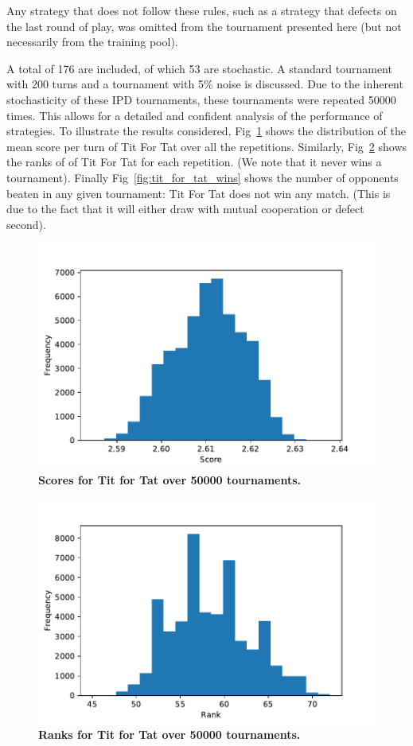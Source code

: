 \documentclass[10pt,letterpaper]{article}
\begin{document}
Any strategy that does not follow these rules, such as a strategy that defects
on the last round of play, was omitted from the tournament presented here (but
not necessarily from the training pool).

A total of 176 are included, of which
53 are stochastic.
A standard tournament with 200
turns and a tournament with 5\% noise is
discussed. Due to the inherent stochasticity of these IPD tournaments, these
tournaments were repeated 50000
times. This allows for a detailed and confident analysis of the performance of
strategies. To illustrate the results considered,
Fig~\ref{fig:tit_for_tat_scores} shows the distribution of the mean score per
turn of Tit For Tat over all the repetitions. Similarly,
Fig~\ref{fig:tit_for_tat_ranks} shows the ranks of of Tit For Tat for each
repetition. (We note that it never wins a tournament). Finally
Fig~\ref{fig:tit_for_tat_wins} shows the number of opponents beaten in any given
tournament: Tit For Tat does not win any match. (This is due to the fact that it
will either draw with mutual cooperation or defect second).

\begin{figure}[!hbtp]
        \centering
        \includegraphics[width=.5\textwidth]{standard_tft_scores.pdf}
        \caption{\bf Scores for Tit for Tat over
        50000 tournaments.}
        \label{fig:tit_for_tat_scores}
\end{figure}

\begin{figure}[!hbtp]
        \centering
        \includegraphics[width=.5\textwidth]{standard_tft_ranks.pdf}
        \caption{\bf Ranks for Tit for Tat over
        50000 tournaments.}
        \label{fig:tit_for_tat_ranks}
\end{figure}
\end{document}
